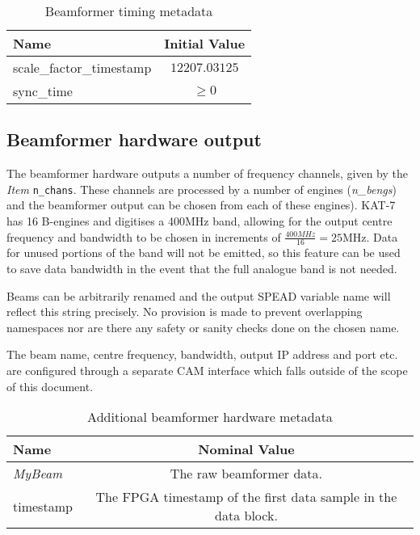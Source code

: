 \documentclass[11pt,english,twoside]{article}
\begin{document}
\begin{table}[htdp]
\caption{Beamformer timing metadata}
\begin{center}
\begin{tabular}{|l|c|} \hline
{\bf Name}       & {\bf Initial Value} \\ \hline
scale\_factor\_timestamp & $12207.03125$ \\ \hline
sync\_time & $\geq 0$ \\ \hline
\end{tabular}
\end{center}
\label{tab:bftiming}
\end{table}%


\subsection{Beamformer hardware output}\label{sec:beamformerhwout}
The beamformer hardware outputs a number of frequency channels, given by the \emph{Item} {\tt n\_chans}. These channels are processed by a number
of engines (\emph{n\_bengs}) and the beamformer output can be chosen from each of these engines). KAT-7 has 16 B-engines and digitises a 400MHz
band, allowing for the output centre frequency and bandwidth to be chosen in increments of $\frac{400MHz}{16}=25$MHz. Data for unused portions
of the band will not be emitted, so this feature can be used to save data bandwidth in the event that the full analogue band is not needed.

Beams can be arbitrarily renamed and the output SPEAD variable name will reflect this string precisely. No provision is made to prevent
overlapping namespaces nor are there any safety or sanity checks done on the chosen name.

The beam name, centre frequency, bandwidth, output IP address and port etc. are configured through a separate CAM interface which falls outside
of the scope of this document.

\begin{table}[htbp]
\caption{Additional beamformer hardware metadata}
\begin{center}
\begin{tabular}{|l|c|} \hline
{\bf Name} & {\bf Nominal Value} \\ \hline
\emph{MyBeam} & The raw beamformer data. \\ \hline
timestamp & The FPGA timestamp of the first data sample in the data block. \\ \hline
\end{tabular}
\end{center}
\label{tab:beamformerhw}
\end{table}%
\end{document}
